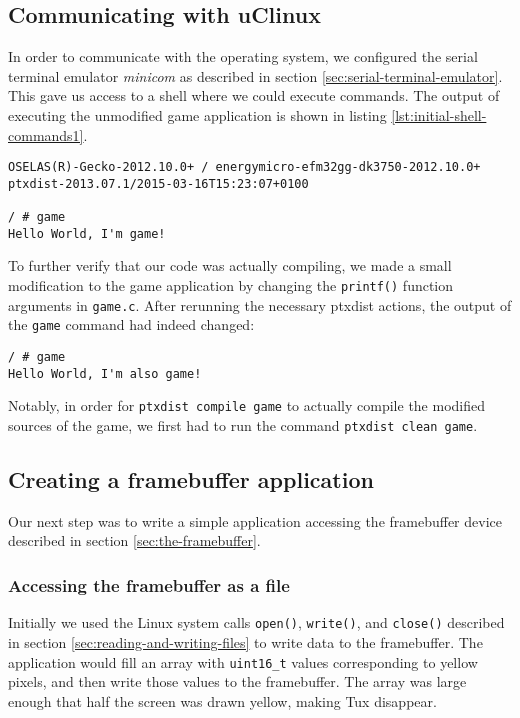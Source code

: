 \subsection{Communicating with uClinux}
In order to communicate with the operating system, we configured the serial terminal emulator \emph{minicom} as described in section \ref{sec:serial-terminal-emulator}. This gave us access to a shell where we could execute commands. The output of executing the unmodified game application is shown in listing \ref{lst:initial-shell-commands1}.
\lstset{style=lststyle-terminal}
\begin{lstlisting}[caption=The original game application,label=lst:initial-shell-commands1]
OSELAS(R)-Gecko-2012.10.0+ / energymicro-efm32gg-dk3750-2012.10.0+
ptxdist-2013.07.1/2015-03-16T15:23:07+0100

/ # game
Hello World, I'm game!
\end{lstlisting}

To further verify that our code was actually compiling, we made a small modification to the game application by changing the \texttt{printf()} function arguments in \texttt{game.c}. After rerunning the necessary ptxdist actions, the output of the \texttt{game} command had indeed changed:
\lstset{style=lststyle-terminal}
\begin{lstlisting}[caption=A modified game application,label=lst:initial-shell-commands2]
/ # game
Hello World, I'm also game!
\end{lstlisting}
Notably, in order for \texttt{ptxdist compile game} to actually compile the modified sources of the game, we first had to run the command \texttt{ptxdist clean game}.

\subsection{Creating a framebuffer application}
Our next step was to write a simple application accessing the framebuffer device described in section \ref{sec:the-framebuffer}.

\subsubsection{Accessing the framebuffer as a file}
Initially we used the Linux system calls \texttt{open()}, \texttt{write()}, and \texttt{close()} described in section \ref{sec:reading-and-writing-files} to write data to the framebuffer. The application would fill an array with \texttt{uint16\_t} values corresponding to yellow pixels, and then write those values to the framebuffer. The array was large enough that half the screen was drawn yellow, making Tux disappear. 

